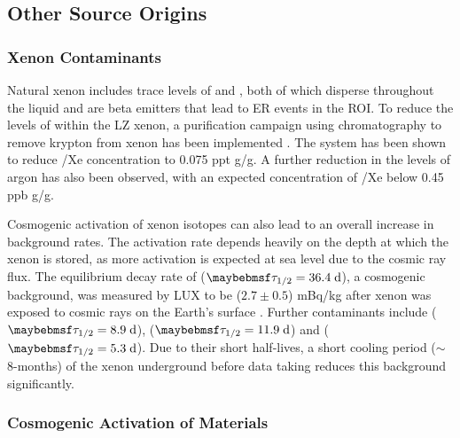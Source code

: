 \subsection{Other Source Origins}
\label{subsec:other_bkkg_sources}

\subsubsection{Xenon Contaminants}

Natural xenon includes trace levels of \KrEF{} and \ArTN{}, both of which disperse throughout the liquid and are beta emitters that lead to ER events in the ROI. To reduce the levels of \KrEF{} within the LZ xenon, a purification campaign using chromatography to remove krypton from xenon has been implemented \cite{lz_tdr}. The system has been shown to reduce \KrNAT{}/Xe concentration to 0.075 ppt g/g. A further reduction in the levels of argon has also been observed, with an expected concentration of \ArNAT{}/Xe below 0.45 ppb g/g.

Cosmogenic activation of xenon isotopes can also lead to an overall increase in  background rates. The activation rate depends heavily on the depth at which the xenon is stored, as more activation is expected at sea level due to the cosmic ray flux. The equilibrium decay rate of \XeOTSeven{} ($\tau_{1/2} = 36.4 \; \MathText{d}$), a cosmogenic background, was measured by LUX to be ($2.7 \pm 0.5$) mBq/kg after xenon was exposed to cosmic rays on the Earth’s surface \cite{radiogenic_muon_lux}. Further contaminants include \XeOTNm{} ($\tau_{1/2} = 8.9 \; \MathText{d}$), \XeOTOm{} ($\tau_{1/2} = 11.9 \; \MathText{d}$) and \XeOTT{} ($\tau_{1/2} = 5.3 \; \MathText{d}$). Due to their short half-lives, a short cooling period ($\sim$8-months) of the xenon underground before data taking reduces this background significantly. 


\subsubsection{Cosmogenic Activation of Materials}

